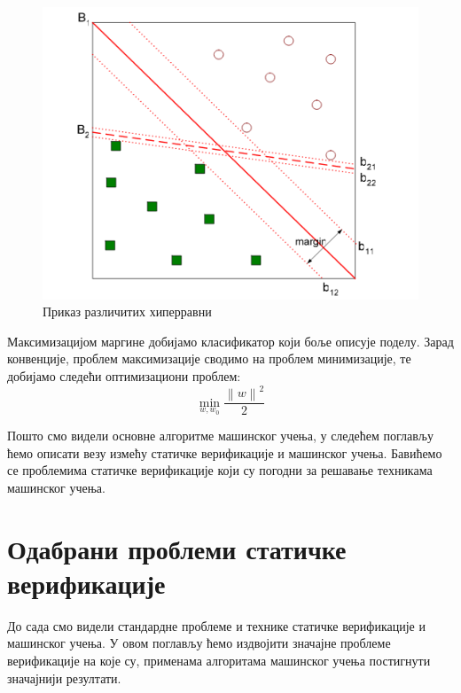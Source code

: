 \documentclass[a4paper]{article}
\newcommand{\norm}[1]{\left\lVert#1\right\rVert}
\begin{document}
{\begin{figure}[h!]
\begin{center}
\includegraphics[scale=0.6]{svn.png}
\end{center}
\caption{Приказ различитих хиперравни}
\label{fig:svm}
\end{figure}

Максимизацијом маргине добијамо класификатор који боље описује поделу. Зарад конвенције, проблем максимизације сводимо на проблем минимизације, те добијамо следећи оптимизациони проблем:
\begin{equation}
    \min_{w, w_0} \frac{ {\norm{w}}^2 }{2}
\end{equation}


Пошто смо видели основне алгоритме машинског учења, у следећем поглављу ћемо описати везу измећу статичке верификације и машинског учења. Бавићемо се проблемима статичке верификације који су погодни за решавање техникама машинског учења.


\section{Одабрани проблеми статичке верификације}
До сада смо видели стандардне проблеме и технике статичке верификације и машинског учења. У овом поглављу ћемо издвојити значајне проблеме верификације на које су, применама алгоритама машинског учења постигнути значајнији резултати.


}
\end{document}
